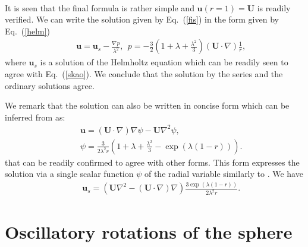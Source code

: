 \documentclass[aps,prx,twocolumn,amsmath,amssymb,amsfonts]{revtex4-2}
\begin{document}
{{\begin{appendices}
\begin{eqnarray}
\end{eqnarray}
It is seen that the final formula is rather simple and $\bm u(r=1)=\bm U$ is readily verified. We can write the solution given by Eq.~(\ref{fis}) in the form given by Eq.~(\ref{helm})
\begin{eqnarray}&&\!\!\!\!\!\!
\bm u=\bm u_s-\frac{\nabla p}{\lambda^2}, \ \ p=-\frac{3}{2}\left(1\!+\!\lambda\!+\!\frac{\lambda^2}{3}\right)  (\bm U\cdot \nabla)\frac{1}{r},
\end{eqnarray}
where $\bm u_s$ is a solution of the Helmholtz equation which can be readily seen to agree with Eq.~(\ref{skao}). We conclude that the solution by the series and the ordinary solutions agree.

We remark that the solution can also be written in concise form which can be inferred from \cite{maxeyriley,brg} as:
\begin{eqnarray}&&\!\!\!\!\!\!
\bm u=(\bm U\cdot\nabla)\nabla\psi-\bm U\nabla^2\psi,%
\nonumber\\&&
\psi= \frac{3}{2\lambda^2 r}\left(1\!+\!\lambda\!+\!\frac{\lambda^2}{3}-\exp(\lambda(1-r))\right). %
\end{eqnarray}
that can be readily confirmed to agree with other forms. This form expresses the solution via a single scalar function $\psi$ of the radial variable similarly to \cite{LL}. We have
\begin{eqnarray}&&\!\!\!\!\!\!
\bm u_s=\left(\bm U\nabla^2 - (\bm U\cdot\nabla)\nabla\right) \frac{3\exp(\lambda(1-r))}{2\lambda^2 r}.
\end{eqnarray}

\section{Oscillatory rotations of the sphere} \label{ur}


\end{appendices}}}
\end{document}
